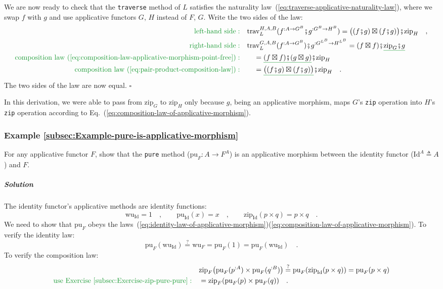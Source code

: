 We are now ready to check that the \lstinline!traverse! method of
$L$ satisfies the naturality law~(\ref{eq:traverse-applicative-naturality-law}),
where we swap $f$ with $g$ and use applicative functors $G$, $H$
instead of $F$, $G$. Write the two sides of the law:
\begin{align*}
{\color{greenunder}\text{left-hand side}:}\quad & \text{trav}_{L}^{H,A,B}(f^{:A\rightarrow G^{B}}\bef g^{:G^{B}\rightarrow H^{B}})=\big((f\bef g)\boxtimes(f\bef g)\big)\bef\text{zip}_{H}\quad,\\
{\color{greenunder}\text{right-hand side}:}\quad & \text{trav}_{L}^{G,A,B}(f^{:A\rightarrow G^{B}})\bef g^{:G^{L^{B}}\rightarrow H^{L^{B}}}=(f\boxtimes f)\bef\gunderline{\text{zip}_{G}\bef g}\\
{\color{greenunder}\text{composition law~(\ref{eq:composition-law-applicative-morphism-point-free})}:}\quad & \quad=\gunderline{(f\boxtimes f)\bef(g\boxtimes g)}\bef\text{zip}_{H}\\
{\color{greenunder}\text{composition law~(\ref{eq:pair-product-composition-law})}:}\quad & \quad=\gunderline{\big((f\bef g)\boxtimes(f\bef g)\big)}\bef\text{zip}_{H}\quad.
\end{align*}
The two sides of the law are now equal. $\square$

In this derivation, we were able to pass from $\text{zip}_{G}$ to
$\text{zip}_{H}$ only because $g$, being an applicative morphism,
maps $G$\textsf{'}s \lstinline!zip! operation into $H$\textsf{'}s \lstinline!zip!
operation according to Eq.~(\ref{eq:composition-law-of-applicative-morphism}).

\subsubsection{Example \label{subsec:Example-pure-is-applicative-morphism}\ref{subsec:Example-pure-is-applicative-morphism}}

For any applicative functor $F$, show that the \lstinline!pure!
method ($\text{pu}_{F}:A\rightarrow F^{A}$) is an applicative morphism
between the identity functor ($\text{Id}^{A}\triangleq A$) and $F$.

\subparagraph{Solution}

The identity functor\textsf{'}s applicative methods are identity functions:
\[
\text{wu}_{\text{Id}}=1\quad,\quad\quad\text{pu}_{\text{Id}}(x)=x\quad,\quad\quad\text{zip}_{\text{Id}}(p\times q)=p\times q\quad.
\]
We need to show that $\text{pu}_{F}$ obeys the laws~(\ref{eq:identity-law-of-applicative-morphism})\textendash (\ref{eq:composition-law-of-applicative-morphism}).
To verify the identity law:
\[
\text{pu}_{F}(\text{wu}_{\text{Id}})\overset{?}{=}\text{wu}_{F}=\text{pu}_{F}(1)=\text{pu}_{F}(\text{wu}_{\text{Id}})\quad.
\]
To verify the composition law:
\begin{align*}
 & \text{zip}_{F}\big(\text{pu}_{F}(p^{:A})\times\text{pu}_{F}(q^{:B})\big)\overset{?}{=}\text{pu}_{F}(\text{zip}_{\text{Id}}(p\times q))=\text{pu}_{F}(p\times q)\\
{\color{greenunder}\text{use Exercise~\ref{subsec:Exercise-zip-pure-pure}}:}\quad & =\text{zip}_{F}(\text{pu}_{F}(p)\times\text{pu}_{F}(q))\quad.
\end{align*}

